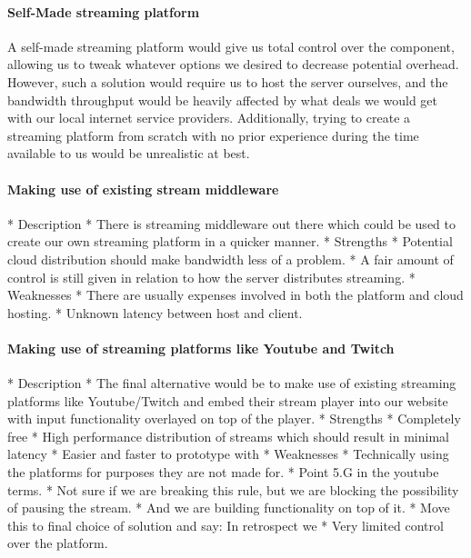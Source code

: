 \paragraph{Self-Made streaming platform}
A self-made streaming platform would give us total control over the component, allowing us to tweak whatever options we desired to decrease potential overhead. However, such a solution would require us to host the server ourselves, and the bandwidth throughput would be heavily affected by what deals we would get with our local internet service providers. Additionally, trying to create a streaming platform from scratch with no prior experience during the time available to us would be unrealistic at best.

\paragraph{Making use of existing stream middleware}
    * Description
        * There is streaming middleware out there which could be used to create our own streaming platform in a quicker manner. 
    * Strengths
        * Potential cloud distribution should make bandwidth less of a problem.
        * A fair amount of control is still given in relation to how the server distributes streaming. 
    * Weaknesses
        * There are usually expenses involved in both the platform and cloud hosting.
        * Unknown latency between host and client. 
\paragraph{Making use of streaming platforms like Youtube and Twitch}
    * Description
        * The final alternative would be to make use of existing streaming platforms like Youtube/Twitch and embed their stream player into our website with input functionality overlayed on top of the player. 
    * Strengths
        * Completely free
        * High performance distribution of streams which should result in minimal latency
        * Easier and faster to prototype with
    * Weaknesses
        * Technically using the platforms for purposes they are not made for.
            * Point 5.G in the youtube terms. 
                * Not sure if we are breaking this rule, but we are blocking the possibility of pausing the stream.  
                * And we are building functionality on top of it.
                * Move this to final choice of solution and say: In retrospect we
        * Very limited control over the platform. 
